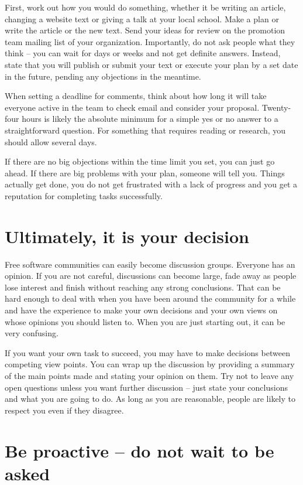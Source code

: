 First, work out how you would do something, whether it be writing an article,
changing a website text or giving a talk at your local school. Make a plan or
write the article or the new text. Send your ideas for review on the promotion
team mailing list of your organization. Importantly, do not ask people what they
think -- you can wait for days or weeks and not get definite answers. Instead,
state that you will publish or submit your text or execute your plan by a set
date in the future, pending any objections in the meantime.

When setting a deadline for comments, think about how long it will take everyone
active in the team to check email and consider your proposal. Twenty-four hours
is likely the absolute minimum for a simple yes or no answer to a
straightforward question. For something that requires reading or research, you
should allow several days.

If there are no big objections within the time limit you set, you can just go
ahead. If there are big problems with your plan, someone will tell you. Things
actually get done, you do not get frustrated with a lack of progress and you get
a reputation for completing tasks successfully.

\section*{Ultimately, it is your decision}

Free software communities can easily become discussion groups. Everyone has an
opinion. If you are not careful, discussions can become large, fade away as
people lose interest and finish without reaching any strong conclusions. That
can be hard enough to deal with when you have been around the community for a
while and have the experience to make your own decisions and your own views on
whose opinions you should listen to. When you are just starting out, it can be
very confusing.

If you want your own task to succeed, you may have to make decisions between
competing view points. You can wrap up the discussion by providing a summary of
the main points made and stating your opinion on them. Try not to leave any open
questions unless you want further discussion -- just state your conclusions and
what you are going to do. As long as you are reasonable, people are likely to
respect you even if they disagree.

\section*{Be proactive -- do not wait to be asked}

